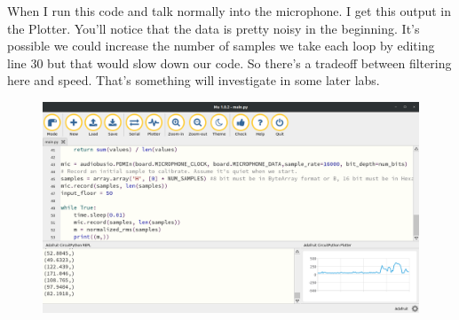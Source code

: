 {\begin{figure}[H]
\begin{center}
  \end{center}
\end{figure}
When I run this code and talk normally into the microphone. I get this output in the Plotter. You’ll notice that the data is pretty noisy in the beginning. It’s possible we could increase the number of samples we take each loop by editing line 30 but that would slow down our code. So there’s a tradeoff between filtering here and speed. That’s something will investigate in some later labs.
\begin{figure}[H]
  \begin{center}
    \includegraphics[width=\textwidth]{Figures/sound_mu.png}
  \end{center}
\end{figure}
}
